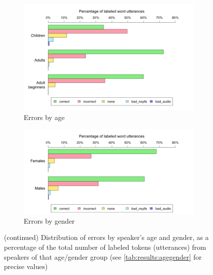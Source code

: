 			\begin{figure}[p]
			\ContinuedFloat
			\centering
			
				\begin{subfigure}{\textwidth}
					\setcounter{subfigure}{1}
					\centering
					\includegraphics[width=\textwidth]{img/plots/judgmentsAge}
					\caption{Errors by age}
					\label{fig:agegenderbars:age}
				\end{subfigure}
				
				\vspace{2em}
			
				\begin{subfigure}{\textwidth}
					\centering
					\includegraphics[width=\textwidth]{img/plots/judgmentsGender}
					\caption{Errors by gender}
					\label{fig:agegenderbars:gender}
				\end{subfigure}
				
				\vspace{1.5em}
				
				\caption[Error distribution by speaker age and gender (cont.)]{(continued) Distribution of errors by speaker's age and gender,
				as a percentage of the total number of labeled tokens (utterances) from speakers of that age/gender group
				(see \cref{tab:results:agegender} for precise values)
				}
				
			\end{figure}
					
